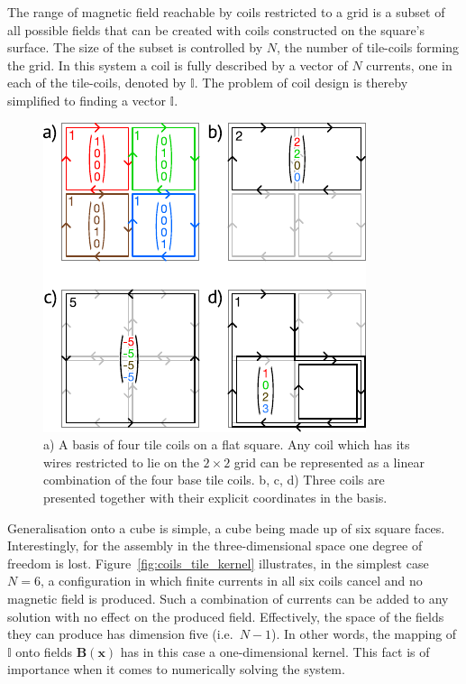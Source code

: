 The range of magnetic field reachable by coils restricted to a grid is a subset of all possible fields that can be created with coils constructed on the square's surface. The size of the subset is controlled by $N$, the number of tile-coils forming the grid.
In this system a coil is fully described by a vector of $N$ currents, one in each of the tile-coils, denoted by $\mathbb{I}$. The problem of coil design is thereby simplified to finding a vector $\mathbb{I}$.


\begin{figure}
  \centering
  \includegraphics[width=0.6\linewidth]{gfx/coils/tile_basis.pdf}
  \caption{a) A basis of four tile coils on a flat square. Any coil which has its wires restricted to lie on the $2 \times 2$ grid can be represented as a linear combination of the four base tile coils. b, c, d) Three coils are presented together with their explicit coordinates in the basis.}
  \label{fig:coils_tile_basis}
\end{figure}

Generalisation onto a cube is simple, a cube being made up of six square faces. Interestingly, for the assembly in the three-dimensional space one degree of freedom is lost.  Figure~\ref{fig:coils_tile_kernel} illustrates, in the simplest case $N = 6$, a configuration in which finite currents in all six coils cancel and no magnetic field is produced. Such a combination of currents can be added to any solution with no effect on the produced field. Effectively, the space of the fields they can produce has dimension five (i.e.\ $N-1$). In other words, the mapping of $\mathbb{I}$ onto fields $\mathbf{B}(\mathbf{x})$ has in this case a one-dimensional kernel. This fact is of importance when it comes to numerically solving the system.

